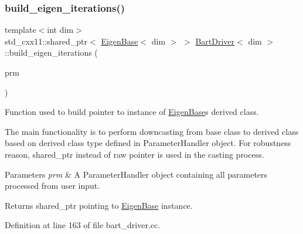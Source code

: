\subsubsection{\texorpdfstring{build\+\_\+eigen\+\_\+iterations()}{build\_eigen\_iterations()}}
{\footnotesize\ttfamily template$<$int dim$>$ \\
std\+\_\+cxx11\+::shared\+\_\+ptr$<$ \hyperlink{class_eigen_base}{Eigen\+Base}$<$ dim $>$ $>$ \hyperlink{class_bart_driver}{Bart\+Driver}$<$ dim $>$\+::build\+\_\+eigen\+\_\+iterations (\begin{DoxyParamCaption}\item[{const Parameter\+Handler \&}]{prm }\end{DoxyParamCaption})\hspace{0.3cm}{\ttfamily [private]}}



Function used to build pointer to instance of \hyperlink{class_eigen_base}{Eigen\+Base}\textquotesingle{}s derived class. 

The main functionality is to perform downcasting from base class to derived class based on derived class type defined in Parameter\+Handler object. For robustness reason, shared\+\_\+ptr instead of raw pointer is used in the casting process.


\begin{DoxyParams}{Parameters}
{\em prm} & A Parameter\+Handler object containing all parameters processed from user input. \\
\hline
\end{DoxyParams}
\begin{DoxyReturn}{Returns}
shared\+\_\+ptr pointing to \hyperlink{class_eigen_base}{Eigen\+Base} instance. 
\end{DoxyReturn}


Definition at line 163 of file bart\+\_\+driver.\+cc.

\mbox{\label{class_bart_driver_a10475395d7db9274b69349420460243d}} 
